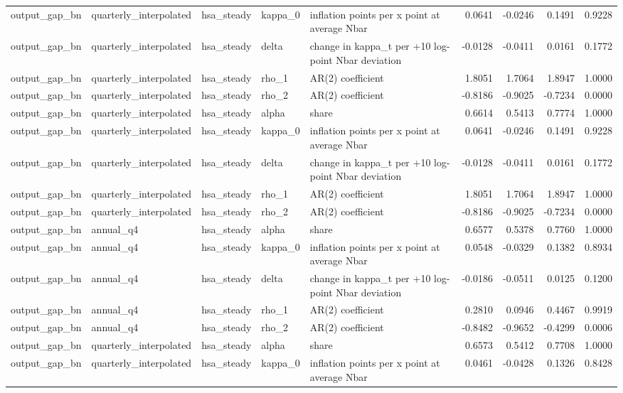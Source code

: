 \begin{tabular}{lllllrrrr}
output\_gap\_bn & quarterly\_interpolated & hsa\_steady & kappa\_0 & inflation points per x point at average Nbar & 0.0641 & -0.0246 & 0.1491 & 0.9228 \\
output\_gap\_bn & quarterly\_interpolated & hsa\_steady & delta & change in kappa\_t per +10 log-point Nbar deviation & -0.0128 & -0.0411 & 0.0161 & 0.1772 \\
output\_gap\_bn & quarterly\_interpolated & hsa\_steady & rho\_1 & AR(2) coefficient & 1.8051 & 1.7064 & 1.8947 & 1.0000 \\
output\_gap\_bn & quarterly\_interpolated & hsa\_steady & rho\_2 & AR(2) coefficient & -0.8186 & -0.9025 & -0.7234 & 0.0000 \\
output\_gap\_bn & quarterly\_interpolated & hsa\_steady & alpha & share & 0.6614 & 0.5413 & 0.7774 & 1.0000 \\
output\_gap\_bn & quarterly\_interpolated & hsa\_steady & kappa\_0 & inflation points per x point at average Nbar & 0.0641 & -0.0246 & 0.1491 & 0.9228 \\
output\_gap\_bn & quarterly\_interpolated & hsa\_steady & delta & change in kappa\_t per +10 log-point Nbar deviation & -0.0128 & -0.0411 & 0.0161 & 0.1772 \\
output\_gap\_bn & quarterly\_interpolated & hsa\_steady & rho\_1 & AR(2) coefficient & 1.8051 & 1.7064 & 1.8947 & 1.0000 \\
output\_gap\_bn & quarterly\_interpolated & hsa\_steady & rho\_2 & AR(2) coefficient & -0.8186 & -0.9025 & -0.7234 & 0.0000 \\
output\_gap\_bn & annual\_q4 & hsa\_steady & alpha & share & 0.6577 & 0.5378 & 0.7760 & 1.0000 \\
output\_gap\_bn & annual\_q4 & hsa\_steady & kappa\_0 & inflation points per x point at average Nbar & 0.0548 & -0.0329 & 0.1382 & 0.8934 \\
output\_gap\_bn & annual\_q4 & hsa\_steady & delta & change in kappa\_t per +10 log-point Nbar deviation & -0.0186 & -0.0511 & 0.0125 & 0.1200 \\
output\_gap\_bn & annual\_q4 & hsa\_steady & rho\_1 & AR(2) coefficient & 0.2810 & 0.0946 & 0.4467 & 0.9919 \\
output\_gap\_bn & annual\_q4 & hsa\_steady & rho\_2 & AR(2) coefficient & -0.8482 & -0.9652 & -0.4299 & 0.0006 \\
output\_gap\_bn & quarterly\_interpolated & hsa\_steady & alpha & share & 0.6573 & 0.5412 & 0.7708 & 1.0000 \\
output\_gap\_bn & quarterly\_interpolated & hsa\_steady & kappa\_0 & inflation points per x point at average Nbar & 0.0461 & -0.0428 & 0.1326 & 0.8428 \\

\end{tabular}
